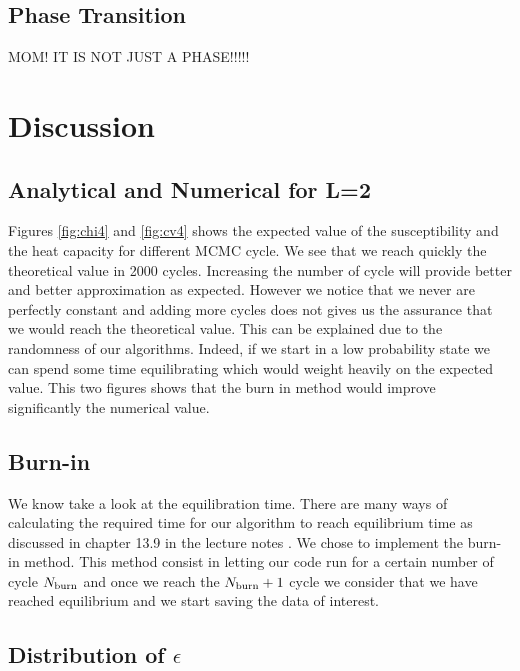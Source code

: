 \documentclass[english,notitlepage,reprint,nofootinbib]{revtex4-2}  %
\begin{document}
	\subsection{Phase Transition}\label{subsec:num phase transition}

	MOM! IT IS NOT JUST A PHASE!!!!!
	
	\section{Discussion}\label{sec:discussion}
	\subsection{Analytical and Numerical for L=2}\label{subsec:dis 2x2}
	
	Figures \ref{fig:chi4} and \ref{fig:cv4} shows the expected value of the susceptibility
	and the heat capacity for different MCMC cycle. We see that we reach quickly the theoretical
	value in 2000 cycles. Increasing the number of cycle will provide better and better 
	approximation as expected. However we notice that we never are perfectly constant and adding
	more cycles does not gives us the assurance that we would reach the theoretical value. This 
	can be explained due to the randomness of our algorithms. Indeed, if we start in a low probability state we can spend some time equilibrating which would weight heavily on the 
	expected value. This two figures shows that the burn in method would improve significantly 
	the numerical value.
	
	
	\subsection{Burn-in}\label{subsec:dis burnin}
	
	We know take a look at the equilibration time. There are many ways of calculating the required
	time for our algorithm to reach equilibrium time as discussed in chapter 13.9 in the lecture notes \cite{Morten15}. We chose
	to implement the burn-in method. This method consist in letting our code run for a certain number
	of cycle $N_{\rm burn}$ and once we reach the $N_{\rm burn} + 1$ cycle we consider that we have reached equilibrium and we start saving the data of interest.    
	
	
	\subsection{Distribution of $\epsilon$}\label{subsec:dis epsilon}
	
\end{document}
